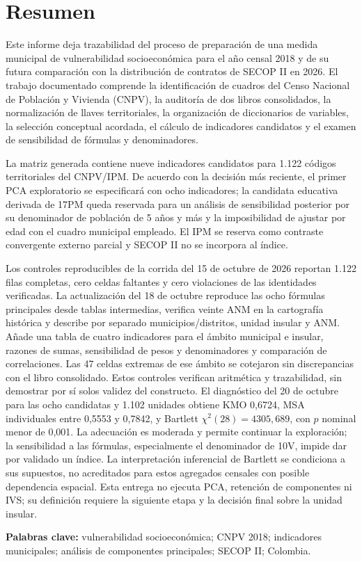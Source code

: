 \section*{Resumen}

Este informe deja trazabilidad del proceso de preparación de una medida municipal de vulnerabilidad socioeconómica para el año censal 2018 y de su futura comparación con la distribución de contratos de SECOP II en 2026. El trabajo documentado comprende la identificación de cuadros del Censo Nacional de Población y Vivienda (CNPV), la auditoría de dos libros consolidados, la normalización de llaves territoriales, la organización de diccionarios de variables, la selección conceptual acordada, el cálculo de indicadores candidatos y el examen de sensibilidad de fórmulas y denominadores.

La matriz generada contiene nueve indicadores candidatos para 1.122 códigos territoriales del CNPV/IPM. De acuerdo con la decisión más reciente, el primer PCA exploratorio se especificará con ocho indicadores; la candidata educativa derivada de 17PM queda reservada para un análisis de sensibilidad posterior por su denominador de población de 5 años y más y la imposibilidad de ajustar por edad con el cuadro municipal empleado. El IPM se reserva como contraste convergente externo parcial y SECOP II no se incorpora al índice.

Los controles reproducibles de la corrida del 15 de octubre de 2026 reportan 1.122 filas completas, cero celdas faltantes y cero violaciones de las identidades verificadas. La actualización del 18 de octubre reproduce las ocho fórmulas principales desde tablas intermedias, verifica veinte ANM en la cartografía histórica y describe por separado municipios/distritos, unidad insular y ANM. Añade una tabla de cuatro indicadores para el ámbito municipal e insular, razones de sumas, sensibilidad de pesos y denominadores y comparación de correlaciones. Las 47 celdas extremas de ese ámbito se cotejaron sin discrepancias con el libro consolidado. Estos controles verifican aritmética y trazabilidad, sin demostrar por sí solos validez del constructo. El diagnóstico del 20 de octubre para las ocho candidatas y 1.102 unidades obtiene KMO 0,6724, MSA individuales entre 0,5553 y 0,7842, y Bartlett $\chi^2(28)=4305{,}689$, con $p$ nominal menor de 0,001. La adecuación es moderada y permite continuar la exploración; la sensibilidad a las fórmulas, especialmente el denominador de 10V, impide dar por validado un índice. La interpretación inferencial de Bartlett se condiciona a sus supuestos, no acreditados para estos agregados censales con posible dependencia espacial. Esta entrega no ejecuta PCA, retención de componentes ni IVS; su definición requiere la siguiente etapa y la decisión final sobre la unidad insular.

\noindent\textbf{Palabras clave:} vulnerabilidad socioeconómica; CNPV 2018; indicadores municipales; análisis de componentes principales; SECOP II; Colombia.

\clearpage

